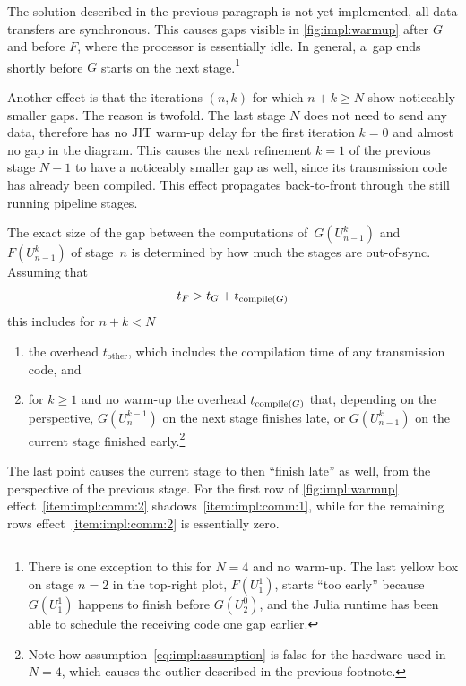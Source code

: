 The solution described in the previous paragraph is not yet implemented,
\ie all data transfers are synchronous.
This causes gaps visible in \autoref{fig:impl:warmup} after $G$ and before $F$,
where the processor is essentially idle.
In general, a~gap ends shortly before $G$ starts on the next stage.\footnote{%
  There is one exception to this for $N=4$ and no warm-up.
  The last yellow box on stage $n=2$ in the top-right plot, $F(U_1^1)$,
  starts \enquote{too early} because $G(U_1^1)$ happens to finish before $G(U_2^0)$,
  and the Julia runtime has been able to schedule the receiving code one gap earlier.
}

Another effect is that the iterations $(n,k)$ for which $n+k \geq N$ show noticeably smaller gaps.
The reason is twofold.
The last stage $N$ does not need to send any data,
therefore has no \ac{JIT} warm-up delay for the first iteration $k=0$ and almost no gap in the diagram.
This causes the next refinement $k=1$ of the previous stage $N-1$ to have a noticeably smaller gap as well,
since its transmission code has already been compiled.
This effect propagates back-to-front through the still running pipeline stages.

The exact size of the gap between the computations of~$G(U_{n-1}^k)$ and~$F(U_{n-1}^k)$ of stage~$n$ is determined by
how much the stages are out-of-sync.
Assuming that
\begin{equation}
\label{eq:impl:assumption}
  t_F > t_G + t_{\operatorname{compile}(G)}
\end{equation}
this includes for $n+k < N$
\begin{enumerate}
  \item\label{item:impl:comm:1}
    the overhead $t_\text{other}$,
    which includes \eg the compilation time of any transmission code,
    and
  \item\label{item:impl:comm:2}
    for $k\geq 1$ and no warm-up
    the overhead $t_{\operatorname{compile}(G)}$ that,
    depending on the perspective,
    $G(U_n^{k-1})$ on the next stage finishes late,
    or $G(U_{n-1}^k)$ on the current stage finished early.\footnote{%
      Note how assumption~\eqref{eq:impl:assumption} is false for the hardware used in $N=4$,
      which causes the outlier described in the previous footnote.
    }
\end{enumerate}
The last point causes the current stage to then \enquote{finish late} as well,
from the perspective of the previous stage.
For the first row of \autoref{fig:impl:warmup} effect~\ref{item:impl:comm:2} shadows~\ref{item:impl:comm:1},
while for the remaining rows effect~\ref{item:impl:comm:2} is essentially zero.

